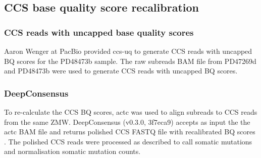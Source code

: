 \subsection{CCS base quality score recalibration}

\subsubsection{CCS reads with uncapped base quality scores}
 
Aaron Wenger at PacBio provided ccs-uq to generate CCS reads with uncapped BQ scores for the PD48473b sample. The raw subreads BAM file from PD47269d and PD48473b were used to generate CCS reads with uncapped BQ scores.

\subsubsection{DeepConsensus}
To re-calculate the CCS BQ scores, actc \cite{actc} was used to align subreads to CCS reads from the same ZMW. DeepConsensus (v0.3.0, 3f7eca9) accepts as input the the actc BAM file and returns polished CCS FASTQ file with recalibrated BQ scores \cite{Baid2022-or}. The polished CCS reads were processed as described to call somatic mutations and normalisation somatic mutation counts. 


%
%
%

